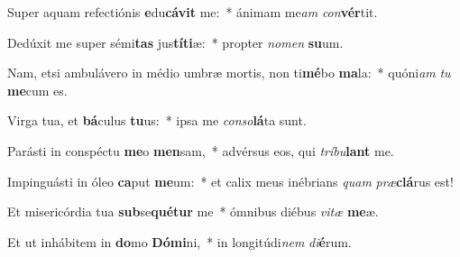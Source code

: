 \item Super aquam refectiónis \textbf{e}du\textbf{cá}\textbf{vit} me:~* ánimam me\textit{am} \textit{con}\textbf{vér}tit.
\item Dedúxit me super sémi\textbf{tas} jus\textbf{tí}\textbf{ti}æ:~* propter \textit{no}\textit{men} \textbf{su}um.
\item Nam, etsi ambulávero in médio umbræ mortis, non ti\textbf{mé}bo \textbf{ma}la:~* quóni\textit{am} \textit{tu} \textbf{me}cum es.
\item Virga tua, et \textbf{bá}culus \textbf{tu}us:~* ipsa me \textit{con}\textit{so}\textbf{lá}ta sunt.
\item Parásti in conspéctu \textbf{me}o \textbf{men}sam,~* advérsus eos, qui \textit{trí}\textit{bu}\textbf{lant} me.
\item Impinguásti in óleo \textbf{ca}put \textbf{me}um:~* et calix meus inébrians \textit{quam} \textit{præ}\textbf{clá}rus est!
\item Et misericórdia tua \textbf{sub}se\textbf{qué}\textbf{tur} me~* ómnibus diébus \textit{vi}\textit{tæ} \textbf{me}æ.
\item Et ut inhábitem in \textbf{do}mo \textbf{Dó}\textbf{mi}ni,~* in longitúdi\textit{nem} \textit{di}\textbf{é}rum.
